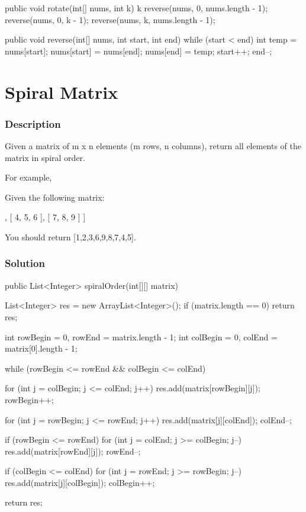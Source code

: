\begin{Code}
public void rotate(int[] nums, int k) {
    k %
    reverse(nums, 0, nums.length - 1);
    reverse(nums, 0, k - 1);
    reverse(nums, k, nums.length - 1);
}

public void reverse(int[] nums, int start, int end) {
    while (start < end) {
        int temp = nums[start];
        nums[start] = nums[end];
        nums[end] = temp;
        start++;
        end--;
    }
}
\end{Code}

\newpage

\section{Spiral Matrix} %

\subsubsection{Description}
Given a matrix of m x n elements (m rows, n columns), return all elements of the matrix in spiral order.

For example,

Given the following matrix:
\begin{Code}
[
 [ 1, 2, 3 ],
 [ 4, 5, 6 ],
 [ 7, 8, 9 ]
]
\end{Code}

You should return [1,2,3,6,9,8,7,4,5].


\subsubsection{Solution}

\begin{Code}
public List<Integer> spiralOrder(int[][] matrix) {
    List<Integer> res = new ArrayList<Integer>();
    if (matrix.length == 0) { return res; }

    int rowBegin = 0, rowEnd = matrix.length - 1;
    int colBegin = 0, colEnd = matrix[0].length - 1;

    while (rowBegin <= rowEnd && colBegin <= colEnd) {
        for (int j = colBegin; j <= colEnd; j++) {
            res.add(matrix[rowBegin][j]);
        }
        rowBegin++;

        for (int j = rowBegin; j <= rowEnd; j++) {
            res.add(matrix[j][colEnd]);
        }
        colEnd--;

        if (rowBegin <= rowEnd) {
            for (int j = colEnd; j >= colBegin; j--) {
                res.add(matrix[rowEnd][j]);
            }
        }
        rowEnd--;

        if (colBegin <= colEnd) {
            for (int j = rowEnd; j >= rowBegin; j--) {
                res.add(matrix[j][colBegin]);
            }
        }
        colBegin++;
    }

    return res;
}
\end{Code}

